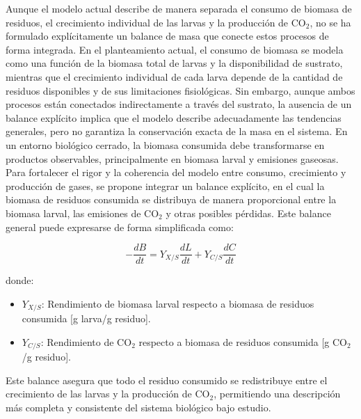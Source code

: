 Aunque el modelo actual describe de manera separada el consumo de biomasa de residuos, el crecimiento individual de las larvas y la producción de CO$_2$, no se ha formulado explícitamente un balance de masa que conecte estos procesos de forma integrada. En el planteamiento actual, el consumo de biomasa se modela como una función de la biomasa total de larvas y la disponibilidad de sustrato, mientras que el crecimiento individual de cada larva depende de la cantidad de residuos disponibles y de sus limitaciones fisiológicas. Sin embargo, aunque ambos procesos están conectados indirectamente a través del sustrato, la ausencia de un balance explícito implica que el modelo describe adecuadamente las tendencias generales, pero no garantiza la conservación exacta de la masa en el sistema. En un entorno biológico cerrado, la biomasa consumida debe transformarse en productos observables, principalmente en biomasa larval y emisiones gaseosas. Para fortalecer el rigor y la coherencia del modelo entre consumo, crecimiento y producción de gases, se propone integrar un balance explícito, en el cual la biomasa de residuos consumida se distribuya de manera proporcional entre la biomasa larval, las emisiones de CO$_2$ y otras posibles pérdidas. Este balance general puede expresarse de forma simplificada como:

\begin{equation}
-\frac{dB}{dt} = Y_{X/S} \frac{dL}{dt} + Y_{C/S} \frac{dC}{dt}
\end{equation}

donde:

\begin{itemize}
    \item $Y_{X/S}$: Rendimiento de biomasa larval respecto a biomasa de residuos consumida [g larva/g residuo].
    \item $Y_{C/S}$: Rendimiento de CO$_2$ respecto a biomasa de residuos consumida [g CO$_2$/g residuo].
\end{itemize}

Este balance asegura que todo el residuo consumido se redistribuye entre el crecimiento de las larvas y la producción de CO$_2$, permitiendo una descripción más completa y consistente del sistema biológico bajo estudio.
